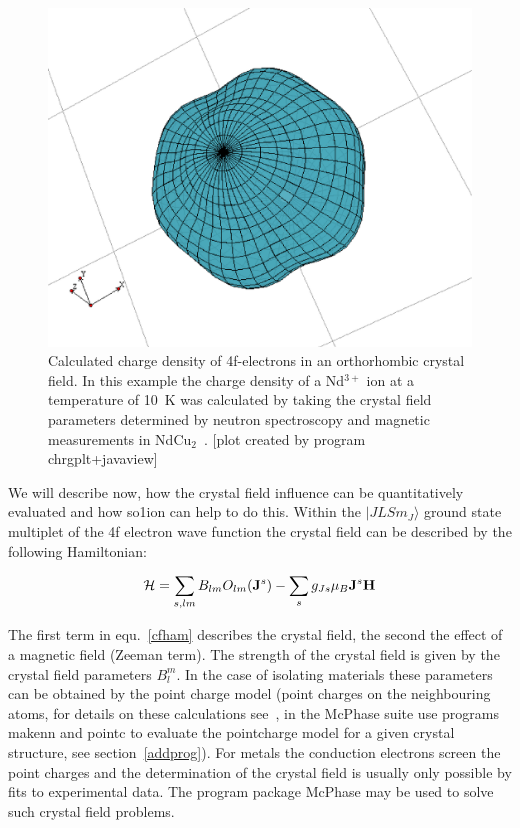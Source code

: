 \begin{figure}[ht]
\includegraphics[angle=0,width=0.7\columnwidth]{figsrc/chrgpla.eps}
\caption{\label{chrgplb}
Calculated charge density of 4f-electrons in an orthorhombic crystal field. In
this example the charge density of a Nd$^{3+}$ ion at a temperature of 10~K was 
calculated by taking the crystal
field parameters determined by neutron spectroscopy and 
magnetic measurements in NdCu$_2$~\cite{gratz91-9297}.
[plot created by program {\prg chrgplt+javaview}]}
\end{figure}

We will describe now, how the crystal field influence can be quantitatively evaluated
and how {\prg so1ion}  can help to do this.
Within the $|JLSm_J \rangle$ ground state multiplet of the 4f electron wave function 
the crystal field can be described by the following Hamiltonian:

\begin{equation}
\label{cfham}
 {\mathcal H}= \sum_{s,lm} B_{lm} O_{lm}({\mathbf J}^s) 
	     - \sum_{s} g_{Js} \mu_B {\mathbf J}^s {\mathbf H} 
\end{equation}

The first term in equ.~\ref{cfham} describes the crystal field, the second the
effect of a magnetic field (Zeeman term). The strength of the crystal field is given by the
crystal field parameters $B_l^m$. In the case of isolating materials these
parameters can be obtained by the point charge model (point charges on the 
neighbouring atoms, for details on these calculations see~\cite{hutchings64-227},
in the {\prg McPhase} suite use programs {\prg makenn} and {\prg pointc} to evaluate
the pointcharge model for a given crystal structure, see section~\ref{addprog}).
For metals the conduction electrons screen the point charges and the determination
of the crystal field is usually only possible by fits to experimental data. 
The program package {\prg McPhase} may be used to solve such crystal field problems.

